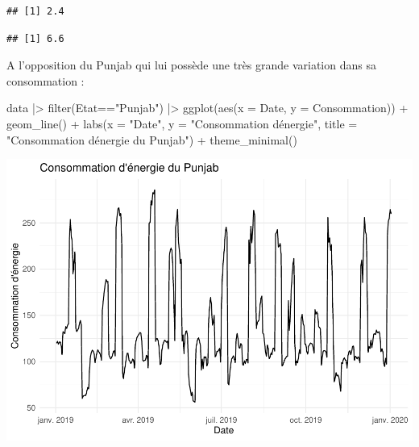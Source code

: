 \documentclass[
]{article}
\newenvironment{Shaded}{\begin{snugshade}}{\end{snugshade}}
\newcommand{\AttributeTok}[1]{\textcolor[rgb]{0.77,0.63,0.00}{#1}}
\newcommand{\FunctionTok}[1]{\textcolor[rgb]{0.00,0.00,0.00}{#1}}
\newcommand{\NormalTok}[1]{#1}
\newcommand{\SpecialCharTok}[1]{\textcolor[rgb]{0.00,0.00,0.00}{#1}}
\newcommand{\StringTok}[1]{\textcolor[rgb]{0.31,0.60,0.02}{#1}}
\begin{document}
\begin{Shaded}
\end{Shaded}

\begin{verbatim}
## [1] 2.4
\end{verbatim}

\begin{Shaded}
\end{Shaded}

\begin{verbatim}
## [1] 6.6
\end{verbatim}

A l'opposition du Punjab qui lui possède une très grande variation dans
sa consommation :

\begin{Shaded}
\begin{Highlighting}[]
\NormalTok{data }\SpecialCharTok{|\textgreater{}} 
  \FunctionTok{filter}\NormalTok{(Etat}\SpecialCharTok{==}\StringTok{"Punjab"}\NormalTok{) }\SpecialCharTok{|\textgreater{}} 
  \FunctionTok{ggplot}\NormalTok{(}\FunctionTok{aes}\NormalTok{(}\AttributeTok{x =}\NormalTok{ Date, }\AttributeTok{y =}\NormalTok{ Consommation)) }\SpecialCharTok{+}
  \FunctionTok{geom\_line}\NormalTok{() }\SpecialCharTok{+}
  \FunctionTok{labs}\NormalTok{(}\AttributeTok{x =} \StringTok{"Date"}\NormalTok{, }\AttributeTok{y =} \StringTok{"Consommation d\textquotesingle{}énergie"}\NormalTok{, }
       \AttributeTok{title =} \StringTok{"Consommation d\textquotesingle{}énergie du Punjab"}\NormalTok{) }\SpecialCharTok{+}
  \FunctionTok{theme\_minimal}\NormalTok{()}
\end{Highlighting}
\end{Shaded}

\includegraphics{Projet_CHESNAIS_GUIBERT_files/figure-latex/unnamed-chunk-15-1.pdf}
\end{document}
